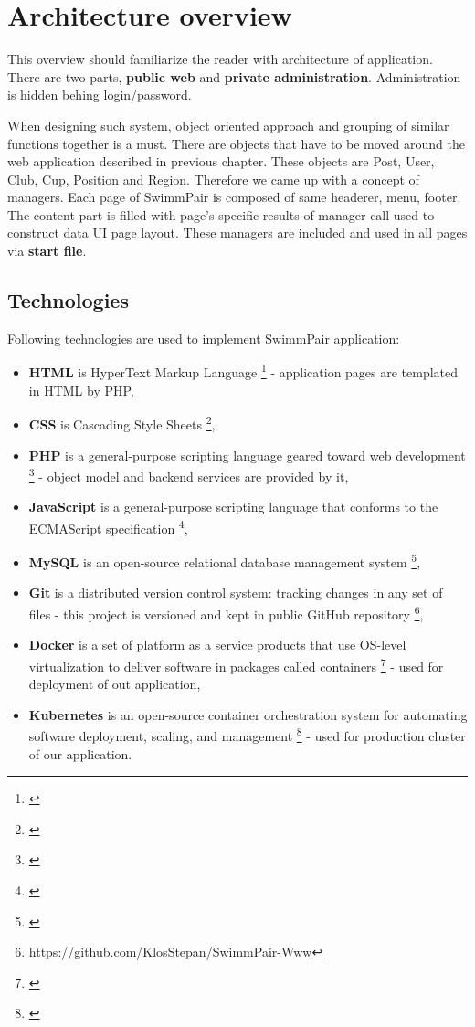 \chapter{Architecture overview}
This overview should familiarize the reader with architecture of application. There are two parts, \textbf{public web} and \textbf{private administration}. Administration is hidden behing login/password. 
\par
When designing such system, object oriented approach and grouping of similar functions together is a must. There are objects that have to be moved around the web application described in previous chapter. These objects are Post, User, Club, Cup, Position and Region. Therefore we came up with a concept of managers. Each page of SwimmPair is composed of same headerer, menu, footer. The content part is filled with page's specific results of manager call used to construct data UI page layout. These managers are included and used in all pages via \textbf{start file}.
\section{Technologies}
Following technologies are used to implement SwimmPair application:
\begin{itemize}
    \item \textbf{HTML} is HyperText Markup Language \footnote{\citep{HTML5Standard}} - application pages are templated in HTML by PHP,
    \item \textbf{CSS} is Cascading Style Sheets \footnote{\citep{CSS3Standard}},
    \item \textbf{PHP} is a general-purpose scripting language geared toward web development \footnote{\citep{PHP74Standard}} - object model and backend services are provided by it,
    \item \textbf{JavaScript}  is a general-purpose scripting language that conforms to the ECMAScript specification \footnote{\citep{ECMADocu}},
    \item \textbf{MySQL} is an open-source relational database management system \footnote{\citep{MySQLDocu}},
    \item \textbf{Git} is a distributed version control system: tracking changes in any set of files - this project is versioned and kept in public GitHub repository \footnote{https://github.com/KlosStepan/SwimmPair-Www},
    \item \textbf{Docker} is a set of platform as a service products that use OS-level virtualization to deliver software in packages called containers \footnote{\citep{DockerDocu}} - used for deployment of out application,
    \item \textbf{Kubernetes} is an open-source container orchestration system for automating software deployment, scaling, and management \footnote{\citep{K8sDocu}} - used for production cluster of our application.
\end{itemize} 
\newpage
